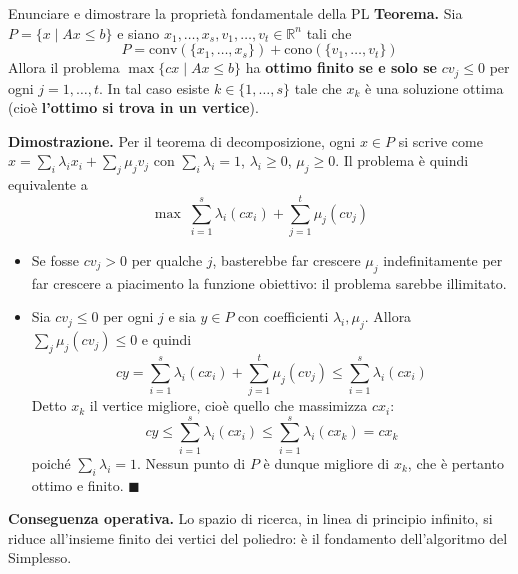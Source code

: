 \documentclass[12pt]{extarticle} %
\begin{document}
\begin{teoriabox}{Enunciare e dimostrare la proprietà fondamentale della PL}
\textbf{Teorema.} Sia $P = \{x \mid Ax \le b\}$ e siano $x_1,\dots,x_s, v_1,\dots,v_t \in \mathbb{R}^n$ tali che
\[
P = \text{conv}(\{x_1,\dots,x_s\}) + \text{cono}(\{v_1,\dots,v_t\})
\]
Allora il problema $\max\{cx \mid Ax \le b\}$ ha \textbf{ottimo finito se e solo se} $cv_j \le 0$ per ogni $j = 1,\dots,t$. In tal caso esiste $k \in \{1,\dots,s\}$ tale che $x_k$ è una soluzione ottima (cioè \textbf{l'ottimo si trova in un vertice}).

\noindent\textbf{Dimostrazione.} Per il teorema di decomposizione, ogni $x \in P$ si scrive come $x = \sum_i \lambda_i x_i + \sum_j \mu_j v_j$ con $\sum_i \lambda_i = 1$, $\lambda_i \ge 0$, $\mu_j \ge 0$. Il problema è quindi equivalente a
\[
\max \; \sum_{i=1}^s \lambda_i (cx_i) + \sum_{j=1}^t \mu_j (cv_j)
\]
\begin{itemize}
    \item[$\implies$] Se fosse $cv_j > 0$ per qualche $j$, basterebbe far crescere $\mu_j$ indefinitamente per far crescere a piacimento la funzione obiettivo: il problema sarebbe illimitato.
    \item[$\impliedby$] Sia $cv_j \le 0$ per ogni $j$ e sia $y \in P$ con coefficienti $\lambda_i, \mu_j$. Allora $\sum_j \mu_j (cv_j) \le 0$ e quindi
    \[
    cy = \sum_{i=1}^s \lambda_i(cx_i) + \sum_{j=1}^t \mu_j(cv_j) \le \sum_{i=1}^s \lambda_i (cx_i)
    \]
    Detto $x_k$ il vertice migliore, cioè quello che massimizza $cx_i$:
    \[
    cy \le \sum_{i=1}^s \lambda_i(cx_i) \le \sum_{i=1}^s \lambda_i (cx_k) = cx_k
    \]
    poiché $\sum_i \lambda_i = 1$. Nessun punto di $P$ è dunque migliore di $x_k$, che è pertanto ottimo e finito. $\blacksquare$
\end{itemize}
\noindent\textbf{Conseguenza operativa.} Lo spazio di ricerca, in linea di principio infinito, si riduce all'insieme finito dei vertici del poliedro: è il fondamento dell'algoritmo del Simplesso.
\end{teoriabox}
\end{document}

